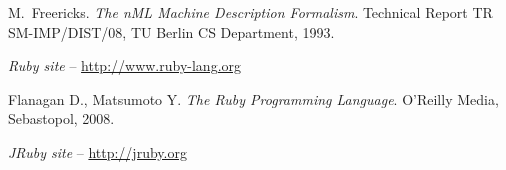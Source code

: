 \documentclass[oneside,final,12pt]{extreport}
\begin{document}


\begin{thebibliography}{1}

M.~Freericks.
\emph{The nML Machine Description Formalism}.
Technical Report TR SM-IMP/DIST/08, TU Berlin CS Department, 1993.

\emph{Ruby site} -- \url{http://www.ruby-lang.org}

Flanagan D., Matsumoto Y.
\emph{The Ruby Programming Language}.
O’Reilly Media, Sebastopol, 2008.

\emph{JRuby site} -- \url{http://jruby.org}

\end{thebibliography}
\end{document}
